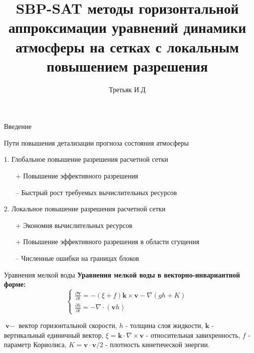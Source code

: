 \documentclass[10pt]{beamer}
\author{Третьяк И.Д}
\title[SBP-SAT методы на сетках с локальным сгущением]{SBP-SAT методы горизонтальной аппроксимации уравнений динамики атмосферы на сетках с локальным повышением разрешения}
\institute{Институт вычислительной математики им. Г.И. Марчука}
\begin{document}
\begin{frame}
\titlepage
\end{frame}


\begin{frame}{Введение}

Пути повышения детализации прогноза состояния атмосферы

1. Глобальное повышение разрешения расчетной сетки

\begin{enumerate}
\item[+] Повышение эффективного разрешения
\item[--] Быстрый рост требуемых вычислительных ресурсов
\end{enumerate}

2. Локальное повышение разрешения расчетной сетки

\begin{enumerate}
\item[+] Экономия вычислительных ресурсов
\item[+] Повышение эффективного разрешения в области сгущения
\item[--] Численные ошибки на границах блоков
\end{enumerate}
\end{frame}



\begin{frame}{Уравнения мелкой воды}
\textbf{Уравнения мелкой воды в векторно-инвариантной форме:}
$$
\begin{cases}
\frac{\partial \textbf{v}}{\partial t} = -(\xi+f)\textbf{k} \times \textbf{v}-\nabla(gh+K)\\
\frac{\partial h}{\partial t} = -\nabla \cdot (\textbf{v}h)
\end{cases}
$$

$\textbf{v} - $ вектор горизонтальной скорости, $h$ - толщина слоя жидкости, $\textbf{k}$ - вертикальный единичный вектор, $\xi = \textbf{k} \cdot \nabla \times \textbf{v}$ - относительная завихренность, $f$ - параметр Кориолиса, $K=\textbf{v}\cdot \textbf{v} \slash 2$ - плотность кинетической энергии.

\end{frame}
\end{document}

